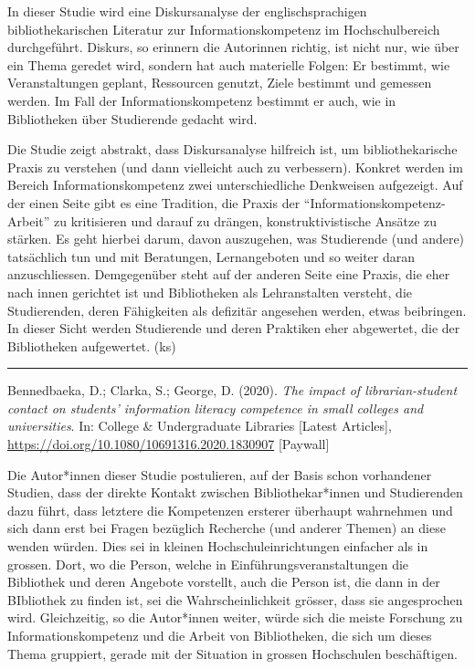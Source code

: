 \documentclass[a4paper,
fontsize=11pt,
oneside,
numbers=noperiodatend,
parskip=half-,
bibliography=totoc,
final
]{scrartcl}
\begin{document}
In dieser Studie wird eine Diskursanalyse der englischsprachigen
bibliothekarischen Literatur zur Informationskompetenz im
Hochschulbereich durchgeführt. Diskurs, so erinnern die Autorinnen
richtig, ist nicht nur, wie über ein Thema geredet wird, sondern hat
auch materielle Folgen: Er bestimmt, wie Veranstaltungen geplant,
Ressourcen genutzt, Ziele bestimmt und gemessen werden. Im Fall der
Informationskompetenz bestimmt er auch, wie in Bibliotheken über
Studierende gedacht wird.

Die Studie zeigt abstrakt, dass Diskursanalyse hilfreich ist, um
bibliothekarische Praxis zu verstehen (und dann vielleicht auch zu
verbessern). Konkret werden im Bereich Informationskompetenz zwei
unterschiedliche Denkweisen aufgezeigt. Auf der einen Seite gibt es eine
Tradition, die Praxis der \enquote{Informationskompetenz-Arbeit} zu
kritisieren und darauf zu drängen, konstruktivistische Ansätze zu
stärken. Es geht hierbei darum, davon auszugehen, was Studierende (und
andere) tatsächlich tun und mit Beratungen, Lernangeboten und so weiter
daran anzuschliessen. Demgegenüber steht auf der anderen Seite eine
Praxis, die eher nach innen gerichtet ist und Bibliotheken als
Lehranstalten versteht, die Studierenden, deren Fähigkeiten als
defizitär angesehen werden, etwas beibringen. In dieser Sicht werden
Studierende und deren Praktiken eher abgewertet, die der Bibliotheken
aufgewertet. (ks)

\begin{center}\rule{0.5\linewidth}{0.5pt}\end{center}

Bennedbaeka, D.; Clarka, S.; George, D. (2020). \emph{The impact of
librarian-student contact on students' information literacy competence
in small colleges and universities}. In: College \& Undergraduate
Libraries {[}Latest Articles{]},
\url{https://doi.org/10.1080/10691316.2020.1830907} {[}Paywall{]}

Die Autor*innen dieser Studie postulieren, auf der Basis schon
vorhandener Studien, dass der direkte Kontakt zwischen
Bibliothekar*innen und Studierenden dazu führt, dass letztere die
Kompetenzen ersterer überhaupt wahrnehmen und sich dann erst bei Fragen
bezüglich Recherche (und anderer Themen) an diese wenden würden. Dies
sei in kleinen Hochschuleinrichtungen einfacher als in grossen. Dort, wo
die Person, welche in Einführungsveranstaltungen die Bibliothek und
deren Angebote vorstellt, auch die Person ist, die dann in der
BIbliothek zu finden ist, sei die Wahrscheinlichkeit grösser, dass sie
angesprochen wird. Gleichzeitig, so die Autor*innen weiter, würde sich
die meiste Forschung zu Informationskompetenz und die Arbeit von
Bibliotheken, die sich um dieses Thema gruppiert, gerade mit der
Situation in grossen Hochschulen beschäftigen.
\end{document}
